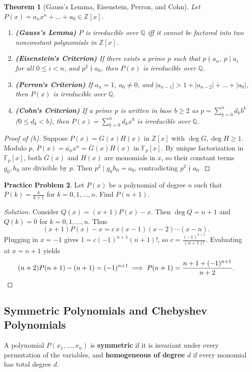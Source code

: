 \documentclass[11pt]{article}
\theoremstyle{plain}
\newtheorem{theorem}{Theorem}[section]
\theoremstyle{definition}
\newtheorem{problem}[theorem]{Practice Problem}
\newenvironment{solution}{\begin{proof}[Solution]}{\end{proof}}
\newcommand{\ZZ}{\mathbb{Z}}
\newcommand{\QQ}{\mathbb{Q}}
\newcommand{\FF}{\mathbb{F}}
\begin{document}
\begin{theorem}[Gauss's Lemma, Eisenstein, Perron, and Cohn]
Let $P(x) = a_n x^n + \dots + a_0 \in \ZZ[x]$.
\begin{enumerate}[label=(\alph*)]
\item \textbf{(Gauss's Lemma)} $P$ is irreducible over $\QQ$ iff it cannot be factored into two nonconstant polynomials in $\ZZ[x]$.
\item \textbf{(Eisenstein's Criterion)} If there exists a prime $p$ such that $p \nmid a_n$, $p \mid a_i$ for all $0 \le i < n$, and $p^2 \nmid a_0$, then $P(x)$ is irreducible over $\QQ$.
\item \textbf{(Perron's Criterion)} If $a_n = 1$, $a_0 \ne 0$, and $|a_{n-1}| > 1 + |a_{n-2}| + \dots + |a_0|$, then $P(x)$ is irreducible over $\QQ$.
\item \textbf{(Cohn's Criterion)} If a prime $p$ is written in base $b \ge 2$ as $p = \sum_{k=0}^n d_k b^k$ ($0 \le d_k < b$), then $P(x) = \sum_{k=0}^n d_k x^k$ is irreducible over $\QQ$.
\end{enumerate}
\end{theorem}
\begin{proof}[Proof of (b)]
Suppose $P(x) = G(x)H(x)$ in $\ZZ[x]$ with $\deg G, \deg H \ge 1$. Modulo $p$, $\overline{P}(x) = \overline{a_n} x^n = \overline{G}(x)\overline{H}(x)$ in $\FF_p[x]$. By unique factorization in $\FF_p[x]$, both $\overline{G}(x)$ and $\overline{H}(x)$ are monomials in $x$, so their constant terms $g_0, h_0$ are divisible by $p$. Then $p^2 \mid g_0 h_0 = a_0$, contradicting $p^2 \nmid a_0$.
\end{proof}

\begin{problem}
Let $P(x)$ be a polynomial of degree $n$ such that $P(k) = \frac{k}{k+1}$ for $k = 0, 1, \dots, n$. Find $P(n+1)$.
\end{problem}
\begin{solution}
Consider $Q(x) = (x+1)P(x) - x$. Then $\deg Q = n+1$ and $Q(k) = 0$ for $k = 0, 1, \dots, n$. Thus
\[
(x+1)P(x) - x = c\, x(x-1)(x-2)\cdots (x-n).
\]
Plugging in $x = -1$ gives $1 = c(-1)^{n+1}(n+1)!$, so $c = \frac{(-1)^{n+1}}{(n+1)!}$. Evaluating at $x = n+1$ yields
\[
(n+2)P(n+1) - (n+1) = (-1)^{n+1} \implies P(n+1) = \frac{n+1 + (-1)^{n+1}}{n+2}. \qedhere
\]
\end{solution}

\subsection{Symmetric Polynomials and Chebyshev Polynomials}
A polynomial $P(x_1,\dots,x_n)$ is \textbf{symmetric} if it is invariant under
every permutation of the variables, and \textbf{homogeneous of degree $d$} if
every monomial has total degree $d$.
\end{document}
